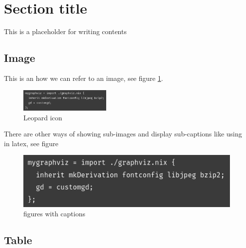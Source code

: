 \documentclass[a4paper,11pt]{article}
\author{Ryu Shinyoung}
\date{}
\title{}
\begin{document}
\section*{Section title}
\label{sec:org3f53205}

This is a placeholder for writing contents


\subsection*{Image}
\label{sec:org3c3341b}

This is an how we can refer to an image, see figure \ref{fig:leopard-icon}.

\begin{figure}[htbp]
\centering
\includegraphics[width=0.4\textwidth]{../../img/7/Input pattern.png}
\caption{\label{fig:leopard-icon}Leopard icon}
\end{figure}

There are other ways of showing sub-images and display sub-captions like using in latex,
see figure

\begin{figure}[htbp]
\centering
\includegraphics[width=.9\linewidth]{../../img/7/Input pattern.png}
\caption{\label{fig:subfig}figures with captions}
\end{figure}
\begin{figure}
    \centering
\end{figure}


\subsection*{Table}
\label{sec:orgcc495a5}
\end{document}
